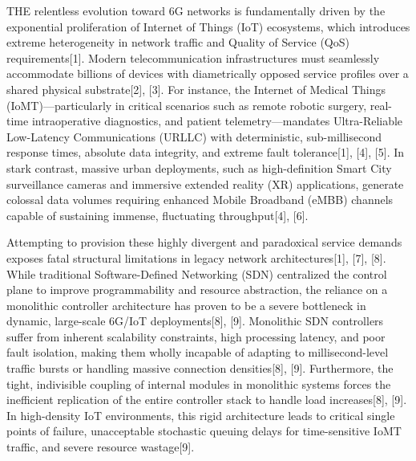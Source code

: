 \textsc{T}\textsc{HE} relentless evolution toward 6G networks is fundamentally driven by the exponential proliferation of Internet of Things (IoT) ecosystems, which introduces extreme heterogeneity in network traffic and Quality of Service (QoS) requirements{[}1{]}. Modern telecommunication infrastructures must seamlessly accommodate billions of devices with diametrically opposed service profiles over a shared physical substrate{[}2{]}, {[}3{]}. For instance, the Internet of Medical Things (IoMT)---particularly in critical scenarios such as remote robotic surgery, real-time intraoperative diagnostics, and patient telemetry---mandates Ultra-Reliable Low-Latency Communications (URLLC) with deterministic, sub-millisecond response times, absolute data integrity, and extreme fault tolerance{[}1{]}, {[}4{]}, {[}5{]}. In stark contrast, massive urban deployments, such as high-definition Smart City surveillance cameras and immersive extended reality (XR) applications, generate colossal data volumes requiring enhanced Mobile Broadband (eMBB) channels capable of sustaining immense, fluctuating throughput{[}4{]}, {[}6{]}.

Attempting to provision these highly divergent and paradoxical service demands exposes fatal structural limitations in legacy network architectures{[}1{]}, {[}7{]}, {[}8{]}. While traditional Software-Defined Networking (SDN) centralized the control plane to improve programmability and resource abstraction, the reliance on a monolithic controller architecture has proven to be a severe bottleneck in dynamic, large-scale 6G/IoT deployments{[}8{]}, {[}9{]}. Monolithic SDN controllers suffer from inherent scalability constraints, high processing latency, and poor fault isolation, making them wholly incapable of adapting to millisecond-level traffic bursts or handling massive connection densities{[}8{]}, {[}9{]}. Furthermore, the tight, indivisible coupling of internal modules in monolithic systems forces the inefficient replication of the entire controller stack to handle load increases{[}8{]}, {[}9{]}. In high-density IoT environments, this rigid architecture leads to critical single points of failure, unacceptable stochastic queuing delays for time-sensitive IoMT traffic, and severe resource wastage{[}9{]}.

